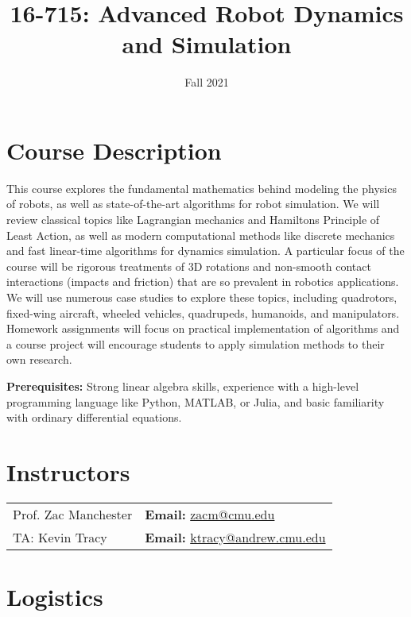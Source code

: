 \documentclass[11pt,letterpaper]{article}
\title{16-715: Advanced Robot Dynamics and Simulation}
\author{Fall 2021}
\date{}
\begin{document}
\maketitle

\section*{Course Description}

This course explores the fundamental mathematics behind modeling the physics of robots, as well as state-of-the-art algorithms for robot simulation. We will review classical topics like Lagrangian mechanics and Hamiltons Principle of Least Action, as well as modern computational methods like discrete mechanics and fast linear-time algorithms for dynamics simulation. A particular focus of the course will be rigorous treatments of 3D rotations and non-smooth contact interactions (impacts and friction) that are so prevalent in robotics applications. We will use numerous case studies to explore these topics, including quadrotors, fixed-wing aircraft, wheeled vehicles, quadrupeds, humanoids, and manipulators. Homework assignments will focus on practical implementation of algorithms and a course project will encourage students to apply simulation methods to their own research.

\medskip
\noindent
\textbf{Prerequisites:} Strong linear algebra skills, experience with a high-level programming language like Python, MATLAB, or Julia, and basic familiarity with ordinary differential equations.

\section*{Instructors}

\begin{center}
\begin{tabular}{l l}
	Prof. Zac Manchester & \textbf{Email:} \href{mailto:zacm@cmu.edu}{zacm@cmu.edu} \\
	TA: Kevin Tracy & \textbf{Email:} \href{mailto:ktracy.cmu.edu}{ktracy@andrew.cmu.edu}
\end{tabular}
\end{center}

\section*{Logistics}
\end{document}
